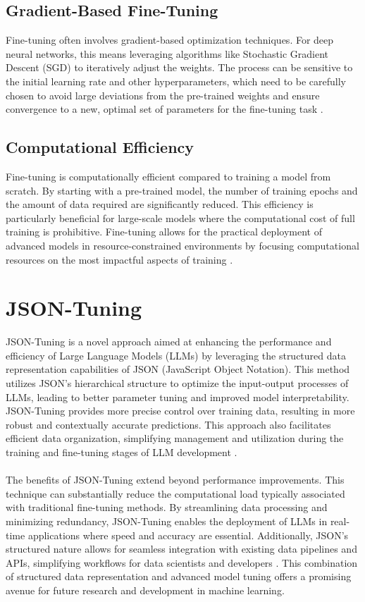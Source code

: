 \subsection{Gradient-Based Fine-Tuning}
Fine-tuning often involves gradient-based optimization techniques. For deep neural networks, this means leveraging algorithms like Stochastic Gradient Descent (SGD) to iteratively adjust the weights. The process can be sensitive to the initial learning rate and other hyperparameters, which need to be carefully chosen to avoid large deviations from the pre-trained weights and ensure convergence to a new, optimal set of parameters for the fine-tuning task \cite{Vrbancic2020Transfer}.

\subsection{Computational Efficiency}
Fine-tuning is computationally efficient compared to training a model from scratch. By starting with a pre-trained model, the number of training epochs and the amount of data required are significantly reduced. This efficiency is particularly beneficial for large-scale models where the computational cost of full training is prohibitive. Fine-tuning allows for the practical deployment of advanced models in resource-constrained environments by focusing computational resources on the most impactful aspects of training \cite{Xiao2023Offsite-Tuning:}.

\section{JSON-Tuning} 
JSON-Tuning is a novel approach aimed at enhancing the performance and efficiency of Large Language Models (LLMs) by leveraging the structured data representation capabilities of JSON (JavaScript Object Notation). This method utilizes JSON's hierarchical structure to optimize the input-output processes of LLMs, leading to better parameter tuning and improved model interpretability. JSON-Tuning provides more precise control over training data, resulting in more robust and contextually accurate predictions. This approach also facilitates efficient data organization, simplifying management and utilization during the training and fine-tuning stages of LLM development \cite{zheng2024llamafactory}.
\\\\
The benefits of JSON-Tuning extend beyond performance improvements. This technique can substantially reduce the computational load typically associated with traditional fine-tuning methods. By streamlining data processing and minimizing redundancy, JSON-Tuning enables the deployment of LLMs in real-time applications where speed and accuracy are essential. Additionally, JSON's structured nature allows for seamless integration with existing data pipelines and APIs, simplifying workflows for data scientists and developers \cite{zhu2024lift}. This combination of structured data representation and advanced model tuning offers a promising avenue for future research and development in machine learning.

